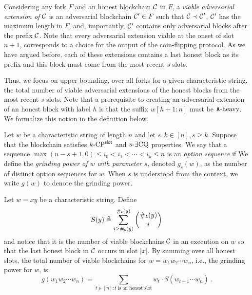 Considering any fork $F$ and an honest blockchain $\mathcal{C}$ in $F$, 
a \emph{viable adversarial extension of $\mathcal{C}$} 
is an adversarial blockchain $\mathcal{C}' \in F$ 
such that $\mathcal{C} \prec \mathcal{C}'$, 
$\mathcal{C}'$ has the maximum length in $F$, 
and, importantly, $\mathcal{C}'$ contains only adversarial blocks after the prefix $\mathcal{C}$. 
Note that every adversarial extension 
viable at the onset of slot $n + 1$, 
corresponds to a choice 
for the output of the coin-flipping protocol. 
As we have argued before, 
each of these extensions contains a last honest block as its prefix 
and this block must come from the most recent $s$ slots.

Thus, we focus on upper bounding, 
over all forks for a given characteristic string, 
the total number of viable adversarial extensions 
of the honest blocks from the most recent $s$ slots.
Note that a prerequisite to creating an adversarial extension 
of an honest block with label $h$ is that 
the suffix $w[h + 1 : n]$ must be $\mathtt{A}\text{-heavy}$.
We formalize this notion in the definition below.

\begin{definition}\label{def:option-sequence}
  Let $w$ be a characteristic string of length $n$ 
  and let $s, k \in [n], s \geq k$. 
  Suppose that the blockchain satisfies ${k}\text{-}\mathrm{CP}^{\mathsf{slot}}$ and ${s}\text{-}\exists\mathrm{CQ}$ properties.
  We say that a sequence
  $
    \max(n-s+1,0) \leq i_0 < i_1 < \cdots < i_k \leq n
  $
  is an \emph{option sequence} if
  We define the \emph{grinding power of $w$ with parameter $s$}, denoted $g_s(w)$, 
  as the 
  number of distinct option sequences for $w$. 
  When $s$ is understood from the context, 
  we write $g(w)$ to denote the grinding power.
\end{definition}
\noindent


Let $w = xy$ be a characteristic string. 
Define
\begin{equation}\label{eq:S_y}
    S(y) 
    \triangleq \sum_{i \geq \#_{\mathtt{h}}(y)}^{\#_{\mathtt{A}}(y)}{ \binom{\#_{\mathtt{A}}(y)}{i} } 
\end{equation}
and notice that it is the number of viable blockchains $\mathcal{C}$
in an execution on $w$ 
so that the last honest block in $\mathcal{C}$ occurs in slot $|x|$. 
By summing over all honest slots, 
the total number of viable blockchains for $w = w_1 w_2 \cdots w_n$,
i.e., the grinding power for $w$, is 
\begin{equation}\label{eq:g_praos}
    g(w_1 w_2 \cdots w_n) 
    = \sum_{ \text{$t \in [n] : t$ is an honest slot} }
      w_t \cdot S(w_{t+1} \cdots w_n)
    \,.  
\end{equation}

